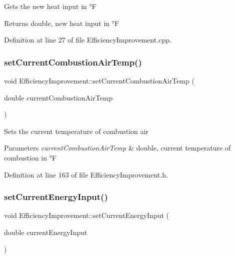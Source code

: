 Gets the new heat input in °F

\begin{DoxyReturn}{Returns}
double, new heat input in °F 
\end{DoxyReturn}


Definition at line 27 of file Efficiency\+Improvement.\+cpp.

\mbox{\label{class_efficiency_improvement_a2fba09e47828dd8e6278251be8d1fa72}} 
\subsubsection{\texorpdfstring{set\+Current\+Combustion\+Air\+Temp()}{setCurrentCombustionAirTemp()}}
{\footnotesize\ttfamily void Efficiency\+Improvement\+::set\+Current\+Combustion\+Air\+Temp (\begin{DoxyParamCaption}\item[{double}]{current\+Combustion\+Air\+Temp }\end{DoxyParamCaption})\hspace{0.3cm}{\ttfamily [inline]}}

Sets the current temperature of combustion air


\begin{DoxyParams}{Parameters}
{\em current\+Combustion\+Air\+Temp} & double, current temperature of combustion in °F \\
\hline
\end{DoxyParams}


Definition at line 163 of file Efficiency\+Improvement.\+h.

\mbox{\label{class_efficiency_improvement_a72c247fcd3f7791566205ec783e13d81}} 
\subsubsection{\texorpdfstring{set\+Current\+Energy\+Input()}{setCurrentEnergyInput()}}
{\footnotesize\ttfamily void Efficiency\+Improvement\+::set\+Current\+Energy\+Input (\begin{DoxyParamCaption}\item[{double}]{current\+Energy\+Input }\end{DoxyParamCaption})\hspace{0.3cm}{\ttfamily [inline]}}

